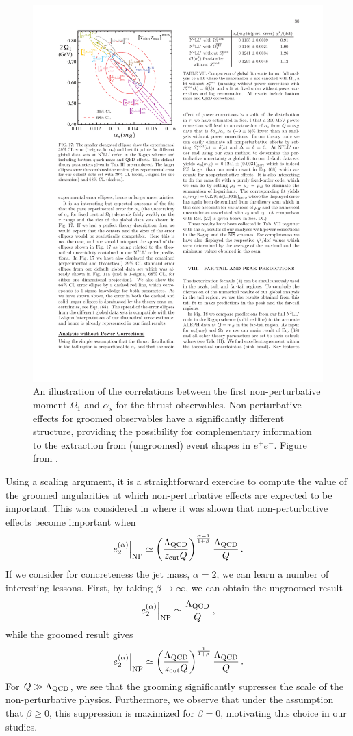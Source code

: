 \begin{figure}
\begin{center}
\includegraphics[width = 0.6\columnwidth]{figures/correlation_firstmoment.pdf}
\end{center}
\caption{An illustration of the correlations between the first non-perturbative moment $\Omega_1$ and $\alpha_s$ for the thrust observables. Non-perturbative effects for groomed observables have a significantly different structure, providing the possibility for complementary information to the extraction from (ungroomed) event shapes in $e^+e^-$. Figure from \cite{Abbate:2010xh}.}
\label{fig:correlation_firstmoment}
\end{figure}


Using a scaling argument, it is a straightforward exercise to compute the value of the groomed angularities at which non-perturbative effects are expected to be important. This was considered in  \cite{Frye:2016aiz}
where it was shown that non-perturbative effects become important when
\begin{align}
\left. e_{2}^{(\alpha)} \right |_{\text{NP}} \simeq  \left( \frac{{\Lambda_\text{QCD}}}{z_{\rm cut} Q}  \right)^{\frac{\alpha-1}{1+\beta}}  \frac{{\Lambda_\text{QCD}}}{Q}\,.
\end{align}
If we consider for concreteness the jet mass, $\alpha=2$, we can learn a number of interesting lessons. First, by taking $\beta\to \infty$, we can obtain the ungroomed result
\begin{align}
\left. e_{2}^{(\alpha)} \right |_{\text{NP}} \simeq  \frac{{\Lambda_\text{QCD}}}{Q}\,,
\end{align} 
while the groomed result gives 
\begin{align}
\left. e_{2}^{(\alpha)} \right |_{\text{NP}} \simeq  \left( \frac{{\Lambda_\text{QCD}}}{z_{\rm cut} Q}  \right)^{\frac{1}{1+\beta}}  \frac{{\Lambda_\text{QCD}}}{Q}\,.
\end{align}
For $Q\gg {\Lambda_\text{QCD}}$, we see that the grooming significantly supresses the scale of the non-perturbative physics. Furthermore, we observe that under the assumption that $\beta \geq 0$, this suppression is maximized for $\beta=0$, motivating this choice in our studies. 

